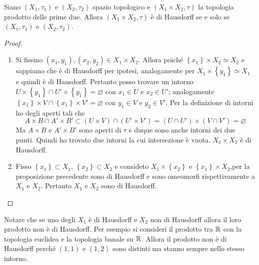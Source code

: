 \begin{theorem}
	Siano $(X_1, \tau_1)$ e $(X_2, \tau_2)$ spazio topologico e $(X_1 \times X_2, \tau)$ la topologia prodotto delle prime due. Allora $(X_1 \times X_2, \tau)$ è di Hausdorff se e solo se $(X_1, \tau_1)$ e $(X_2, \tau_2)$.
\end{theorem} 
\begin{proof}
	\begin{enumerate}
		\item Si fissino $(x_1, y_1), (x_2, y_2) \in X_1 \times X_2$. Allora poiché $\left\{x_1\right\} \times X_2 \simeq X_2$ e sappiamo che è di Hausdorff per ipotesi, analogamente per $X_1 \times \left\{y_1\right\} \simeq X_1$ e quindi è di Hausdorff. Pertanto posso trovare un intorno $U \times \left\{y_1\right\} \cap U' \times \left\{y_1\right\} = \varnothing$ con $x_1 \in U$ e $x_2 \in U'$; analogamente $\left\{x_1\right\} \times V \cap \left\{x_1\right\} \times V' = \varnothing$ con $y_1 \in V$ e $y_2 \in V'$. Per la definizione di intorni ho degli aperti tali che 
		\begin{equation*}
		A \times B \cap A' \times B' \subset (U \times V) \cap (U' \times V') = (U \cap U') \times (V \cap V') = \varnothing
		\end{equation*}
		Ma $A \times B$ e $A' \times B'$ sono aperti di $\tau$ e duque sono anche intorni dei due punti. Quindi ho trovato due intorni la cui intersezione è vuota. $X_1 \times X_2$ è di Hausdorff.
		\item Fisso $\left\{x_1\right\} \subset X_1$, $\left\{x_2\right\} \subset X_2$ e consideto $X_1 \times \left\{x_2\right\}$ e $\left\{x_1\right\} \times X_2$,per la proposizione precedente sono di Hausdorff e sono omeomorfi rispettivamente a $X_1$ e $X_2$. Pertanto $X_1$ e $X_2$ sono di Hausdorff.
	\end{enumerate}
\end{proof}

\begin{remark}
	Notare che se uno degli $X_1$ è di Hausdorff e $X_2$ non di Hausdorff allora il loro prodotto non è di Hausdorff. Per esempio si consideri il prodotto tra $\mathbb{R}$ con la topologia euclidea e la topologia banale su $\mathbb{R}$. Allora il prodotto non è di Hausdorff perché $(1,1)$ e $(1,2)$ sono distinti ma stanno sempre nello stesso intorno. 
	
\end{remark} 


